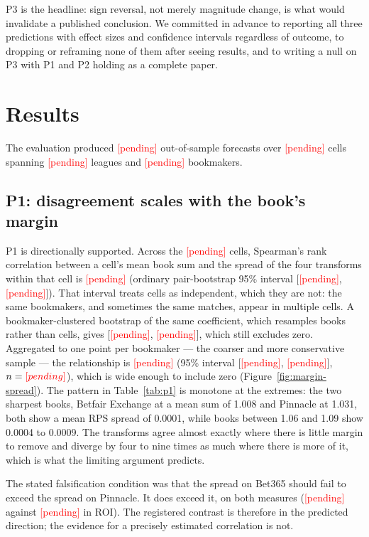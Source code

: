 \documentclass[11pt,a4paper]{article}
\newcommand{\TBD}{\textcolor{red}{[pending]}}
\providecommand{\NForecasts}{\TBD}
\providecommand{\NCells}{\TBD}
\providecommand{\NLeagues}{\TBD}
\providecommand{\NBooks}{\TBD}
\providecommand{\SpreadPinnacle}{\TBD}
\providecommand{\SpreadBetSixtyFive}{\TBD}
\providecommand{\SpearmanMarginSpread}{\TBD}
\providecommand{\SpearmanMarginSpreadLow}{\TBD}
\providecommand{\SpearmanMarginSpreadHigh}{\TBD}
\providecommand{\SpearmanBookSpread}{\TBD}
\providecommand{\SpearmanBookSpreadLow}{\TBD}
\providecommand{\SpearmanBookSpreadHigh}{\TBD}
\providecommand{\SpearmanClusterLow}{\TBD}
\providecommand{\SpearmanClusterHigh}{\TBD}
\providecommand{\NMarginCells}{\TBD}
\providecommand{\NMarginBooks}{\TBD}
\begin{document}
P3 is the headline: sign reversal, not merely magnitude change, is what would
invalidate a published conclusion. We committed in advance to reporting all
three predictions with effect sizes and confidence intervals regardless of
outcome, to dropping or reframing none of them after seeing results, and to
writing a null on P3 with P1 and P2 holding as a complete paper.

\section{Results}
\label{sec:results}

The evaluation produced \NForecasts{} out-of-sample forecasts over \NCells{}
cells spanning \NLeagues{} leagues and \NBooks{} bookmakers.

\subsection{P1: disagreement scales with the book's margin}

P1 is directionally supported. Across the \NMarginCells{} cells, Spearman's rank
correlation between a cell's mean book sum and the spread of the four
transforms within that cell is \SpearmanMarginSpread{} (ordinary
pair-bootstrap 95\% interval [\SpearmanMarginSpreadLow{},
\SpearmanMarginSpreadHigh{}]). That interval treats cells as independent,
which they are not: the same bookmakers, and sometimes the same matches,
appear in multiple cells. A bookmaker-clustered bootstrap of the same
coefficient, which resamples books rather than cells, gives
[\SpearmanClusterLow{}, \SpearmanClusterHigh{}], which still excludes zero.
Aggregated to one point per
bookmaker --- the coarser and more conservative sample --- the relationship
is \SpearmanBookSpread{} (95\% interval [\SpearmanBookSpreadLow{},
\SpearmanBookSpreadHigh{}], $n = \NMarginBooks{}$), which is wide enough to
include zero (Figure~\ref{fig:margin-spread}). The pattern in Table~\ref{tab:p1} is monotone at the
extremes: the two sharpest books, Betfair Exchange at a mean sum of 1.008 and
Pinnacle at 1.031, both show a mean RPS spread of 0.0001, while books between
1.06 and 1.09 show 0.0004 to 0.0009. The transforms agree almost exactly where
there is little margin to remove and diverge by four to nine times as much
where there is more of it, which is what the limiting argument predicts.

The stated falsification condition was that the spread on Bet365 should fail to
exceed the spread on Pinnacle. It does exceed it, on both measures
(\SpreadBetSixtyFive{} against \SpreadPinnacle{} in ROI). The registered
contrast is therefore in the predicted direction; the evidence for a
precisely estimated correlation is not.
\end{document}

